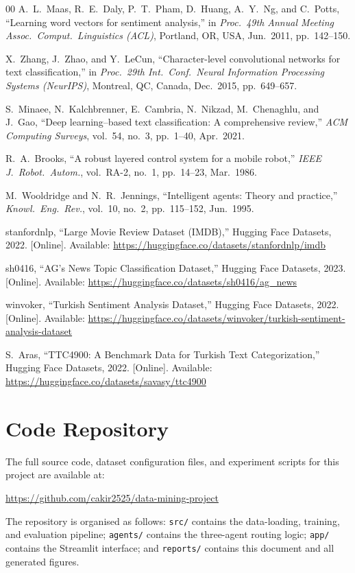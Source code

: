 \documentclass[conference]{IEEEtran}
\begin{document}
\begin{thebibliography}{00}
A.~L.~Maas, R.~E.~Daly, P.~T.~Pham, D.~Huang, A.~Y.~Ng, and C.~Potts,
``Learning word vectors for sentiment analysis,''
in \textit{Proc.\ 49th Annual Meeting Assoc.\ Comput.\ Linguistics (ACL)},
Portland, OR, USA, Jun.\ 2011, pp.~142--150.

X.~Zhang, J.~Zhao, and Y.~LeCun,
``Character-level convolutional networks for text classification,''
in \textit{Proc.\ 29th Int.\ Conf.\ Neural Information Processing Systems (NeurIPS)},
Montreal, QC, Canada, Dec.\ 2015, pp.~649--657.

S.~Minaee, N.~Kalchbrenner, E.~Cambria, N.~Nikzad, M.~Chenaghlu, and J.~Gao,
``Deep learning--based text classification: A comprehensive review,''
\textit{ACM Computing Surveys}, vol.~54, no.~3, pp.~1--40, Apr.\ 2021.

R.~A.~Brooks,
``A robust layered control system for a mobile robot,''
\textit{IEEE J.\ Robot.\ Autom.}, vol.~RA-2, no.~1, pp.~14--23, Mar.\ 1986.

M.~Wooldridge and N.~R.~Jennings,
``Intelligent agents: Theory and practice,''
\textit{Knowl.\ Eng.\ Rev.}, vol.~10, no.~2, pp.~115--152, Jun.\ 1995.

stanfordnlp,
``Large Movie Review Dataset (IMDB),''
Hugging Face Datasets, 2022.
[Online]. Available: \url{https://huggingface.co/datasets/stanfordnlp/imdb}

sh0416,
``AG's News Topic Classification Dataset,''
Hugging Face Datasets, 2023.
[Online]. Available: \url{https://huggingface.co/datasets/sh0416/ag_news}

winvoker,
``Turkish Sentiment Analysis Dataset,''
Hugging Face Datasets, 2022.
[Online]. Available: \url{https://huggingface.co/datasets/winvoker/turkish-sentiment-analysis-dataset}

S.~Aras,
``TTC4900: A Benchmark Data for Turkish Text Categorization,''
Hugging Face Datasets, 2022.
[Online]. Available: \url{https://huggingface.co/datasets/savasy/ttc4900}

\end{thebibliography}

\appendix
\section{Code Repository}
\label{appendix:code}

The full source code, dataset configuration files, and experiment scripts for this project are available at:

\begin{center}
  \href{https://github.com/cakir2525/data-mining-project}{https://github.com/cakir2525/data-mining-project}
\end{center}

The repository is organised as follows: \texttt{src/} contains the data-loading, training,
and evaluation pipeline; \texttt{agents/} contains the three-agent routing logic;
\texttt{app/} contains the Streamlit interface; and \texttt{reports/} contains this
document and all generated figures.
\end{document}
